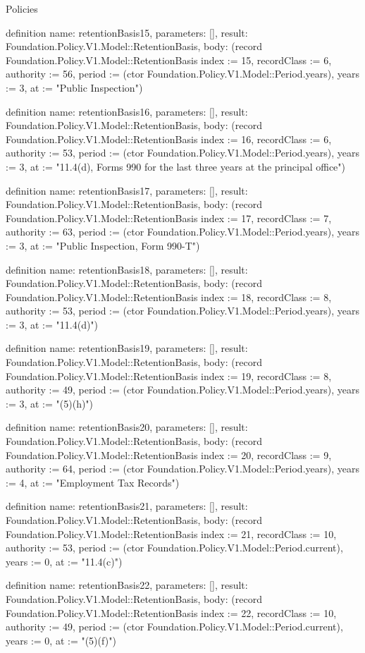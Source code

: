 \begin{lexlean}{Policies}
\begin{semanticmodule}
definition{
  name: retentionBasis15,
  parameters: [],
  result: Foundation.Policy.V1.Model::RetentionBasis,
  body: (record Foundation.Policy.V1.Model::RetentionBasis {index := 15, recordClass := 6, authority := 56, period := (ctor Foundation.Policy.V1.Model::Period.years), years := 3, at := "Public Inspection"})
}

definition{
  name: retentionBasis16,
  parameters: [],
  result: Foundation.Policy.V1.Model::RetentionBasis,
  body: (record Foundation.Policy.V1.Model::RetentionBasis {index := 16, recordClass := 6, authority := 53, period := (ctor Foundation.Policy.V1.Model::Period.years), years := 3, at := "11.4(d), Forms 990 for the last three years at the principal office"})
}

definition{
  name: retentionBasis17,
  parameters: [],
  result: Foundation.Policy.V1.Model::RetentionBasis,
  body: (record Foundation.Policy.V1.Model::RetentionBasis {index := 17, recordClass := 7, authority := 63, period := (ctor Foundation.Policy.V1.Model::Period.years), years := 3, at := "Public Inspection, Form 990-T"})
}

definition{
  name: retentionBasis18,
  parameters: [],
  result: Foundation.Policy.V1.Model::RetentionBasis,
  body: (record Foundation.Policy.V1.Model::RetentionBasis {index := 18, recordClass := 8, authority := 53, period := (ctor Foundation.Policy.V1.Model::Period.years), years := 3, at := "11.4(d)"})
}

definition{
  name: retentionBasis19,
  parameters: [],
  result: Foundation.Policy.V1.Model::RetentionBasis,
  body: (record Foundation.Policy.V1.Model::RetentionBasis {index := 19, recordClass := 8, authority := 49, period := (ctor Foundation.Policy.V1.Model::Period.years), years := 3, at := "(5)(h)"})
}

definition{
  name: retentionBasis20,
  parameters: [],
  result: Foundation.Policy.V1.Model::RetentionBasis,
  body: (record Foundation.Policy.V1.Model::RetentionBasis {index := 20, recordClass := 9, authority := 64, period := (ctor Foundation.Policy.V1.Model::Period.years), years := 4, at := "Employment Tax Records"})
}

definition{
  name: retentionBasis21,
  parameters: [],
  result: Foundation.Policy.V1.Model::RetentionBasis,
  body: (record Foundation.Policy.V1.Model::RetentionBasis {index := 21, recordClass := 10, authority := 53, period := (ctor Foundation.Policy.V1.Model::Period.current), years := 0, at := "11.4(c)"})
}

definition{
  name: retentionBasis22,
  parameters: [],
  result: Foundation.Policy.V1.Model::RetentionBasis,
  body: (record Foundation.Policy.V1.Model::RetentionBasis {index := 22, recordClass := 10, authority := 49, period := (ctor Foundation.Policy.V1.Model::Period.current), years := 0, at := "(5)(f)"})
}


\end{semanticmodule}
\end{lexlean}
